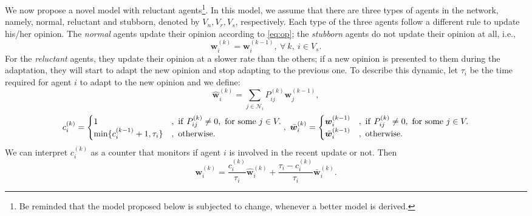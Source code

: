\documentclass[10pt]{article}
\theoremstyle{t}
\begin{document}
We now propose a novel model with reluctant agents\footnote{Be reminded that the model proposed below is subjected to change, whenever a better model is derived.}. In this model, we assume that there are three types of agents in the network, namely, normal, reluctant and stubborn, denoted by $V_n, V_r, V_s$, respectively. Each type of the three agents follow a different rule to update his/her opinion. The \emph{normal} agents update their opinion according to \eqref{eq:op}; the \emph{stubborn} agents do not update their opinion at all, i.e.,
\[
{\bm w}_i^{(k)} = {\bm w}_i^{(k-1)},~\forall~k,~i \in V_s.
\]
For the \emph{reluctant} agents, they update their opinion at a slower rate than the others; if a new opinion is presented to them during the adaptation, they will start to adapt the new opinion and stop adapting to the previous one. To describe this dynamic, let  $\tau_i $ be the time required for agent $i$ to adapt to the new opinion and we define:
\[
\hat{\bm w}_i^{(k)} = \sum_{j \in \mathcal{N}_i} P_{ij}^{(k)} {\bm w}_j^{(k-1)},
\]
\[
c_i^{(k)} = \begin{cases}
1 &,~{\rm if}~P_{ij}^{(k)} \neq 0,~\text{for some}~j \in V. \\
\min\{ c_i^{(k-1)} + 1, \tau_i \} &,~{\rm otherwise}.
\end{cases},~\bar{\bm w}_i^{(k)} = 
\begin{cases}
{\bm w}_i^{(k-1)} &,~{\rm if}~P_{ij}^{(k)} \neq 0,~\text{for some}~j \in V. \\
\bar{\bm w}_i^{(k-1)} &,~{\rm otherwise}.
\end{cases}
\]
We can interpret $c_i^{(k)}$ as a counter that monitors if agent $i$ is involved in the recent update or not. Then
\[
{\bm w}_i^{(k)} = \frac{c_i^{(k)}}{\tau_i} \hat{\bm w}_i^{(k)} + \frac{\tau_i - c_i^{(k)}}{\tau_i} \bar{\bm w}_i^{(k)}.
\]
\end{document}
